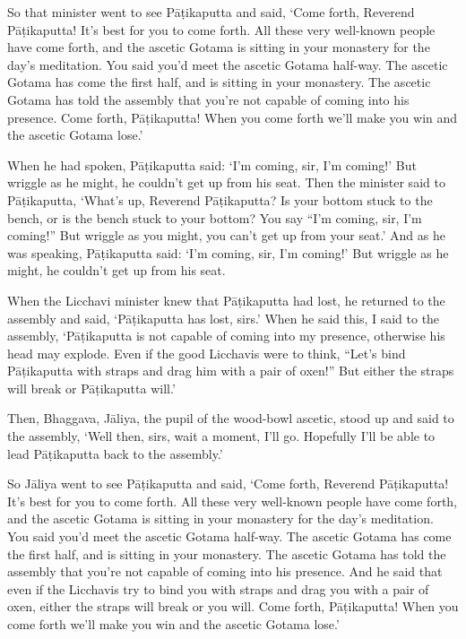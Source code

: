 \documentclass[12pt,openany]{book}%
\begin{document}
So that minister went to see \textsanskrit{Pāṭikaputta} and said, ‘Come forth, Reverend \textsanskrit{Pāṭikaputta}! It’s best for you to come forth. All these very well-known people have come forth, and the ascetic Gotama is sitting in your monastery for the day’s meditation. You said you’d meet the ascetic Gotama half-way. The ascetic Gotama has come the first half, and is sitting in your monastery. The ascetic Gotama has told the assembly that you’re not capable of coming into his presence. Come forth, \textsanskrit{Pāṭikaputta}! When you come forth we’ll make you win and the ascetic Gotama lose.’ 

When he had spoken, \textsanskrit{Pāṭikaputta} said: ‘I’m coming, sir, I’m coming!’ But wriggle as he might, he couldn’t get up from his seat. Then the minister said to \textsanskrit{Pāṭikaputta}, ‘What’s up, Reverend \textsanskrit{Pāṭikaputta}? Is your bottom stuck to the bench, or is the bench stuck to your bottom? You say “I’m coming, sir, I’m coming!” But wriggle as you might, you can’t get up from your seat.’ And as he was speaking, \textsanskrit{Pāṭikaputta} said: ‘I’m coming, sir, I’m coming!’ But wriggle as he might, he couldn’t get up from his seat. 

When the Licchavi minister knew that \textsanskrit{Pāṭikaputta} had lost, he returned to the assembly and said, ‘\textsanskrit{Pāṭikaputta} has lost, sirs.’ When he said this, I said to the assembly, ‘\textsanskrit{Pāṭikaputta} is not capable of coming into my presence, otherwise his head may explode. Even if the good Licchavis were to think, “Let’s bind \textsanskrit{Pāṭikaputta} with straps and drag him with a pair of oxen!” But either the straps will break or \textsanskrit{Pāṭikaputta} will.’ 

Then, Bhaggava, \textsanskrit{Jāliya}, the pupil of the wood-bowl ascetic, stood up and said to the assembly, ‘Well then, sirs, wait a moment, I’ll go. Hopefully I’ll be able to lead \textsanskrit{Pāṭikaputta} back to the assembly.’ 

So \textsanskrit{Jāliya} went to see \textsanskrit{Pāṭikaputta} and said, ‘Come forth, Reverend \textsanskrit{Pāṭikaputta}! It’s best for you to come forth. All these very well-known people have come forth, and the ascetic Gotama is sitting in your monastery for the day’s meditation. You said you’d meet the ascetic Gotama half-way. The ascetic Gotama has come the first half, and is sitting in your monastery. The ascetic Gotama has told the assembly that you’re not capable of coming into his presence. And he said that even if the Licchavis try to bind you with straps and drag you with a pair of oxen, either the straps will break or you will. Come forth, \textsanskrit{Pāṭikaputta}! When you come forth we’ll make you win and the ascetic Gotama lose.’ 
\end{document}
